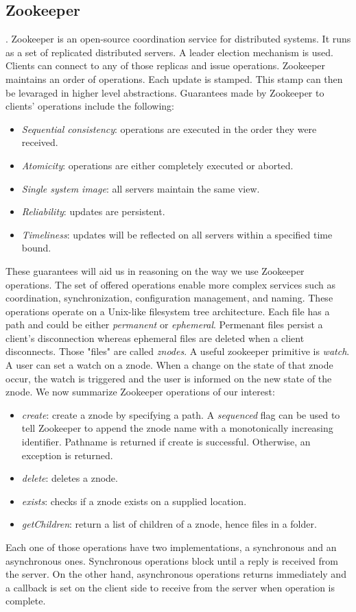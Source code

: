 \subsection{Zookeeper}
. Zookeeper is an open-source coordination service for distributed systems. It runs as a set of replicated distributed servers. A leader election mechanism is used. Clients can connect to any of those replicas and issue operations. Zookeeper maintains an order of operations. Each update is stamped. This stamp can then be levaraged in higher level abstractions. Guarantees made by Zookeeper to clients' operations include the following:
\begin{itemize}
\item{\emph{Sequential consistency}: operations are executed in the order they were received. }
\item{\emph{Atomicity}: operations are either completely executed or aborted. }
\item{\emph{Single system image}: all servers maintain the same view. }
\item{\emph{Reliability}: updates are persistent. }
\item{\emph{Timeliness}: updates will be reflected on all servers within a specified time bound. }
\end{itemize}
These guarantees will aid us in reasoning on the way we use Zookeeper operations. The set of offered operations enable more complex services such as coordination, synchronization, configuration management, and naming. These operations operate on a Unix-like filesystem tree architecture. Each file has a path and could be either \emph{permanent} or \emph{ephemeral}. Permenant files persist a client's disconnection whereas ephemeral files are deleted when a client disconnects. Those "files" are called \emph{znodes}. A useful zookeeper primitive is \emph{watch}. A user can set a watch on a znode. When a change on the state of that znode occur, the watch is triggered and the user is informed on the new state of the znode. We now summarize Zookeeper operations of our interest:
\begin{itemize}
\item{\emph{create}: create a znode by specifying a path. A \emph{sequenced} flag can be used to tell Zookeeper to append the znode name with a monotonically increasing identifier. Pathname is returned if create is successful. Otherwise, an exception is returned.}
\item{\emph{delete}: deletes a znode.}
\item{\emph{exists}: checks if a znode exists on a supplied location.}
\item{\emph{getChildren}: return a list of children of a znode, hence files in a folder.}
\end{itemize}
Each one of those operations have two implementations, a synchronous and an asynchronous ones. Synchronous operations block until a reply is received from the server. On the other hand, asynchronous operations returns immediately and a callback is set on the client side to receive from the server when operation is complete.

